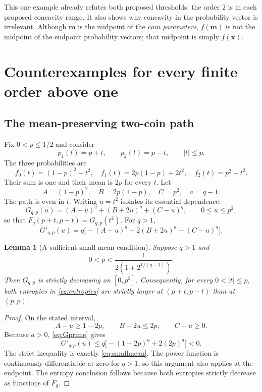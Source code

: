 \documentclass[11pt]{article}
\numberwithin{equation}{section}
\newtheorem{lemma}[theorem]{Lemma}
\theoremstyle{definition}
\theoremstyle{remark}
\begin{document}
This one example already refutes both proposed thresholds: the order $2$
is in each proposed concavity range. It also shows why concavity in the
probability vector is irrelevant. Although $\boldsymbol m$ is the midpoint
of the \emph{coin parameters}, $f(\boldsymbol m)$ is not the midpoint of the
endpoint probability vectors; that midpoint is simply $f(\boldsymbol x)$.

\section{Counterexamples for every finite order above one}\label{bep:sec:allorders}
\subsection{The mean-preserving two-coin path}
Fix $0<p\leq1/2$ and consider
\begin{equation}
 p_1(t)=p+t,\qquad p_2(t)=p-t,\qquad |t|\leq p.
 \label{eq:path}
\end{equation}
The three probabilities are
\begin{equation}
 f_0(t)=(1-p)^2-t^2,\quad
 f_1(t)=2p(1-p)+2t^2,\quad
 f_2(t)=p^2-t^2.\label{eq:threeprob}
\end{equation}
Their sum is one and their mean is $2p$ for every $t$. Let
\begin{equation}
 A=(1-p)^2,\quad B=2p(1-p),\quad C=p^2,\quad a=q-1.
\end{equation}
The path is even in $t$. Writing $u=t^2$ isolates its essential dependence:
\begin{equation}
 G_{q,p}(u)=(A-u)^q+(B+2u)^q+(C-u)^q,
 \qquad 0\leq u\leq p^2,\label{eq:G}
\end{equation}
so that $F_q(p+t,p-t)=G_{q,p}(t^2)$.
For $q>1$,
\begin{equation}
 G'_{q,p}(u)=q\bigl[-(A-u)^a+2(B+2u)^a-(C-u)^a\bigr].
 \label{eq:Gprime}
\end{equation}

\begin{lemma}[A sufficient small-mean condition]\label{lem:smallmean}
Suppose $q>1$ and
\begin{equation}
 0<p<\frac{1}{2(1+2^{1/(q-1)})}.\label{eq:smallmean}
\end{equation}
Then $G_{q,p}$ is strictly decreasing on $[0,p^2]$. Consequently, for every
$0<|t|\leq p$, both entropies in \eqref{eq:entropies} are strictly larger at
$(p+t,p-t)$ than at $(p,p)$.
\end{lemma}
\begin{proof}
On the stated interval,
\[
 A-u\geq1-2p,\qquad B+2u\leq2p,\qquad C-u\geq0.
\]
Because $a>0$, \eqref{eq:Gprime} gives
\[
 G'_{q,p}(u)\leq q\bigl[-(1-2p)^a+2(2p)^a\bigr]<0.
\]
The strict inequality is exactly \eqref{eq:smallmean}. The power function is
continuously differentiable at zero for $q>1$, so this argument also applies
at the endpoint. The entropy conclusion follows because both entropies
strictly decrease as functions of $F_q$.
\end{proof}
\end{document}
